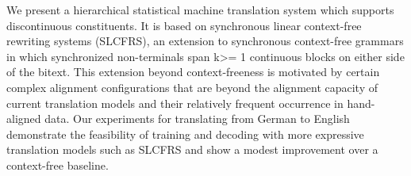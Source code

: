We present a hierarchical statistical machine translation system which supports discontinuous constituents. It is based on synchronous linear context-free rewriting systems (SLCFRS), an extension to synchronous context-free grammars in which synchronized non-terminals span k>= 1 continuous blocks on either side of the bitext. This extension beyond context-freeness is motivated by certain complex alignment configurations that are beyond the alignment capacity of current translation models and their relatively frequent occurrence in hand-aligned data. Our experiments for translating from German to English demonstrate the feasibility of training and decoding with more expressive translation models such as SLCFRS and show a modest improvement over a context-free baseline.
